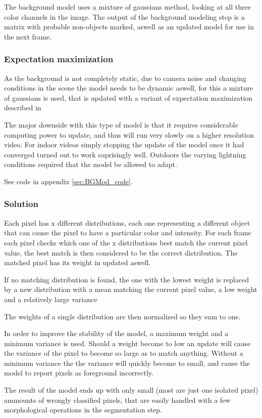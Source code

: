 The background model uses a mixture of gaussians method, looking at all three color channels in the image. The output of the background modeling step is a matrix with probable non-objects marked, aswell as an updated model for use in the next frame.

\subsubsection{Expectation maximization}

As the background is not completely static, due to camera noise and changing conditions in the scene the model needs to be dynamic aswell, for this a mixture of gaussians is used, that is updated with a variant of expectation maximization described in \cite{wood}

The major downside with this type of model is that it requires considerable computing power to update, and thus will run very slowly on a higher resolution video. For indoor videos simply stopping the update of the model once it had converged turned out to work suprisingly well. Outdoors the varying lightning conditions required that the model be allowed to adapt.

See code in appendix \ref{sec:BGMod_code}. %

\subsubsection{Solution}

Each pixel has x different distributions, each one representing a different object that can cause the pixel to have a particular color and intensity. For each frame each pixel checks which one of the x distributions best match the current pixel value, the best match is then considered to be the correct distribution. The matched pixel has its weight in updated aswell. 

If no matching distribution is found, the one with the lowest weight is replaced by a new distribution with a mean matching the current pixel value, a low weight and a relatively large variance

The weights of a single distribution are then normalized so they sum to one.

In order to improve the stability of the model, a maximum weight and a minimum variance is used. Should a weight become to low an update will cause the variance of the pixel to become so large as to match anything. Without a minimum variance the the variance will quickly become to small, and cause the model to report pixels as foreground incorrectly.

The result of the model ends up with only small (most are just one isolated pixel) ammounts of wrongly classified pixels, that are easily handled with a few morphological operations in the segmentation step.

